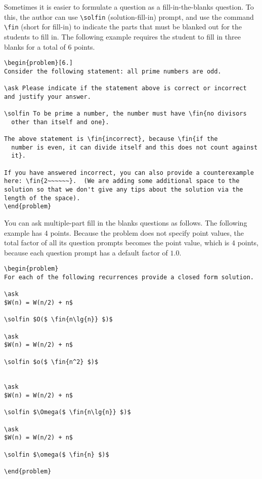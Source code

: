 \begin{example}
Sometimes it is easier to formulate a question as a fill-in-the-blanks
question.  To this, the author can use \lstinline`\solfin`
(solution-fill-in) prompt, and
%
use the command \lstinline`\fin` (short for fill-in) to indicate the
parts that must be blanked  out for  the students to fill in.
%
The following example requires the student
to fill in three blanks for a total of $6$ points.

\begin{lstlisting}
\begin{problem}[6.]
Consider the following statement: all prime numbers are odd.

\ask Please indicate if the statement above is correct or incorrect
and justify your answer.

\solfin To be prime a number, the number must have \fin{no divisors
  other than itself and one}.

The above statement is \fin{incorrect}, because \fin{if the
  number is even, it can divide itself and this does not count against
  it}.

If you have answered incorrect, you can also provide a counterexample
here: \fin{2~~~~~~}.  (We are adding some additional space to the
solution so that we don't give any tips about the solution via the
length of the space).
\end{problem}
\end{lstlisting}
\end{example}


\begin{example}
You can ask multiple-part fill in the blanks questions as follows.
The following example has 4 points.  Because the problem does not specify point values, the total factor of all its question prompts becomes the point value, which is $4$ points, because each question prompt has a default factor of $1.0$.

\begin{lstlisting}
\begin{problem}
For each of the following recurrences provide a closed form solution.

\ask 
$W(n) = W(n/2) + n$

\solfin $O($ \fin{n\lg{n}} $)$

\ask 
$W(n) = W(n/2) + n$

\solfin $o($ \fin{n^2} $)$


\ask 
$W(n) = W(n/2) + n$

\solfin $\Omega($ \fin{n\lg{n}} $)$

\ask 
$W(n) = W(n/2) + n$

\solfin $\omega($ \fin{n} $)$

\end{problem}
\end{lstlisting}
\end{example}

